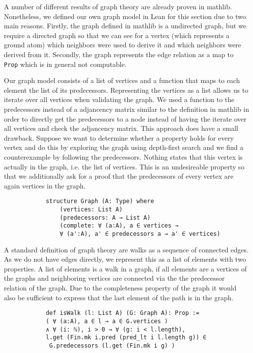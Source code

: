 \documentclass{article}
\begin{document}
        A number of different results of graph theory are already proven in mathlib. Nonetheless, we defined our own graph model in Lean for this section due to two main reasons. Firstly, the graph defined in mathlib is a undirected graph, but we require a directed graph so that we can see for a vertex (which represents a ground atom) which neighbors were used to derive it and which neighbors were derived from it. Secondly, the graph represents the edge relation as a map to \texttt{Prop} which is in general not computable.


        Our graph model consists of a list of vertices and a function that maps to each element the list of its predecessors. Representing the vertices as a list allows us to iterate over all vertices when validating the graph. We used a function to the predecessors instead of a adjancency matrix similar to the definition in mathlib in order to directly get the predecessors to a node instead of having the iterate over all vertices and check the adjancency matrix. This approach does have a small drawback. Suppose we want to determine whether a property holds for every vertex and do this by exploring the graph using depth-first search and we find a counterexample by following the predecessors. Nothing states that this vertex is actually in the graph, i.e. the list of vertices. This is an undesireable property so that we additionally ask for a proof that the predecessors of every vertex are again vertices in the graph.

        \begin{lstlisting}
            structure Graph (A: Type) where
                (vertices: List A)
                (predecessors: A → List A)
                (complete: ∀ (a:A), a ∈ vertices →  
                ∀ (a':A), a' ∈ predecessors a → a' ∈ vertices)
        \end{lstlisting}
        
        A standard definition of graph theory are walks as a sequence of connected edges. As we do not have edges directly, we represent this as a list of elements with two properties. A list of elements is a walk in a graph, if all elements are a vertices of the graphs and neighboring vertices are connected via the the predecessor relation of the graph. Due to the completeness property of the graph it would also be sufficient to express that the last element of the path is in the graph. 

        \begin{lstlisting}
            def isWalk (l: List A) (G: Graph A): Prop :=
            ( ∀ (a:A), a ∈ l → a ∈ G.vertices ) 
            ∧ ∀ (i: ℕ), i > 0 → ∀ (g: i < l.length), 
            l.get (Fin.mk i.pred (pred_lt i l.length g)) ∈ 
             G.predecessors (l.get (Fin.mk i g) )
        \end{lstlisting}
\end{document}
